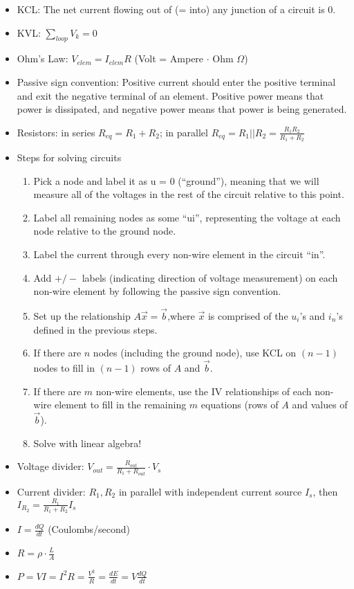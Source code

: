 \documentclass{article}
\begin{document}
\begin{itemize}
	\item KCL: The net current flowing out of (= into) any junction of a circuit is 0.
	\item KVL: $\sum\limits_{loop} V_k = 0$
	\item Ohm's Law: $V_{elem} = I_{elem}R$ (Volt = Ampere $\cdot$ Ohm $\Omega$)
	\item Passive sign convention: Positive current should enter the positive terminal and exit the negative terminal of an element. Positive power means that power is dissipated, and negative power means that power is being generated.
	\item Resistors: in series $R_{eq} = R_1+R_2$; in parallel $R_{eq} = R_1||R_2 = \frac{R_1R_2}{R_1+R_2}$
	\item Steps for solving circuits
	\begin{enumerate}
		\item Pick a node and label it as u = 0 (“ground”), meaning that we will measure all of the voltages in the rest of the circuit relative to this point.
		\item Label all remaining nodes as some “ui”, representing the voltage at each node relative to the ground node.
		\item Label the current through every non-wire element in the circuit “in”.
		\item Add $+/-$ labels (indicating direction of voltage measurement) on each non-wire element by following the passive sign convention.
		\item Set up the relationship $A\vec{x}=\vec{b}$,where $\vec{x}$ is comprised of the $u_i$’s and $i_n$’s defined in the previous steps.
		\item If there are $n$ nodes (including the ground node), use KCL on $(n-1)$ nodes to fill in $(n-1)$ rows of $A$ and $\vec{b}$.
		\item If there are $m$ non-wire elements, use the IV relationships of each non-wire element to fill in the remaining $m$ equations (rows of $A$ and values of $\vec{b}$).
		\item Solve with linear algebra!
	\end{enumerate}
	\item Voltage divider: $V_{out} = \frac{R_{out}}{R_1+R_{out}}\cdot V_s$
	\item Current divider: $R_1,R_2$ in parallel with independent current source $I_s$, then $I_{R_2} = \frac{R_1}{R_1+R_2}I_s$
	\item $I = \frac{dQ}{dt}$ (Coulombs/second)
	\item {\color{red} $R = \rho\cdot\frac{L}{A}$}
	\item $P = VI = I^2R = \frac{V^2}{R} = \frac{dE}{dt} = V\frac{dQ}{dt}$
\end{itemize}
\end{document}
